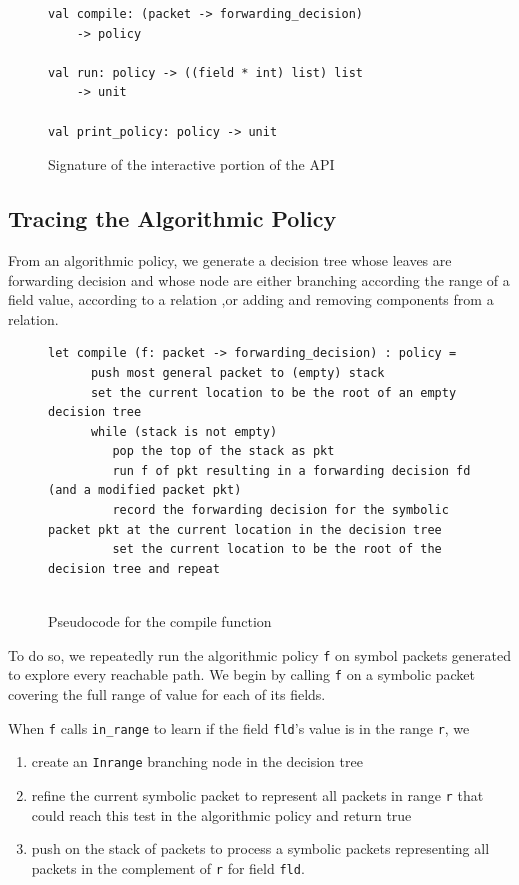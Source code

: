 \documentclass[preprint]{sigplanconf}
\begin{document}
\begin{figure}[ht]
  \begin{lstlisting}
val compile: (packet -> forwarding_decision)
    -> policy
    
val run: policy -> ((field * int) list) list
    -> unit
    
val print_policy: policy -> unit
  \end{lstlisting}

  \caption{Signature of the interactive portion of the API}
  \label{fig:build_api}
\end{figure}

\subsection*{Tracing the Algorithmic Policy}
From an algorithmic policy, we generate a decision tree  whose leaves are forwarding decision and whose node are either branching according the range of a field value, according to a relation ,or adding and removing components from a relation.

\begin{figure}[ht]
\begin{lstlisting}
let compile (f: packet -> forwarding_decision) : policy =
      push most general packet to (empty) stack
      set the current location to be the root of an empty decision tree
      while (stack is not empty)
         pop the top of the stack as pkt
         run f of pkt resulting in a forwarding decision fd (and a modified packet pkt)
         record the forwarding decision for the symbolic packet pkt at the current location in the decision tree
         set the current location to be the root of the decision tree and repeat
  
\end{lstlisting}
\caption{Pseudocode for the compile function}
\label{fig:compile-pseudo}
\end{figure}

To do so, we repeatedly run the algorithmic policy \lstinline|f| on symbol packets generated to explore every reachable path.
We begin by calling \lstinline|f| on a symbolic packet covering the full range of value for each of its fields.

When \lstinline|f| calls \lstinline|in_range| to learn if the field \lstinline|fld|'s value is in the range \lstinline|r|, we
\begin{enumerate}
\item  create an \lstinline|Inrange| branching node in the decision tree
\item refine the current symbolic packet to represent all packets in range \lstinline|r| that could reach this test in the algorithmic policy and return true
\item push on the stack of packets to process a symbolic packets representing all packets in the complement of \lstinline|r| for field \lstinline|fld|.
\end{enumerate}
\end{document}
